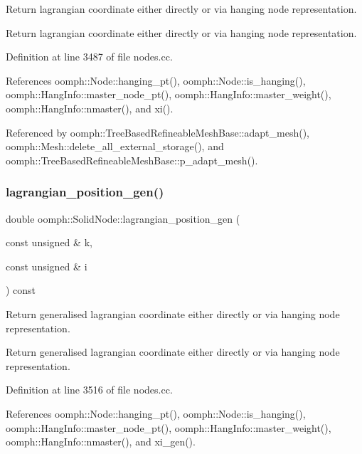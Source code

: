 Return lagrangian coordinate either directly or via hanging node representation. 

Return lagrangian coordinate either directly or via hanging node representation. 

Definition at line 3487 of file nodes.\+cc.



References oomph\+::\+Node\+::hanging\+\_\+pt(), oomph\+::\+Node\+::is\+\_\+hanging(), oomph\+::\+Hang\+Info\+::master\+\_\+node\+\_\+pt(), oomph\+::\+Hang\+Info\+::master\+\_\+weight(), oomph\+::\+Hang\+Info\+::nmaster(), and xi().



Referenced by oomph\+::\+Tree\+Based\+Refineable\+Mesh\+Base\+::adapt\+\_\+mesh(), oomph\+::\+Mesh\+::delete\+\_\+all\+\_\+external\+\_\+storage(), and oomph\+::\+Tree\+Based\+Refineable\+Mesh\+Base\+::p\+\_\+adapt\+\_\+mesh().

\mbox{\label{classoomph_1_1SolidNode_a7d001ac17bfbfdb96209d723577dd598}} 
\subsubsection{\texorpdfstring{lagrangian\+\_\+position\+\_\+gen()}{lagrangian\_position\_gen()}}
{\footnotesize\ttfamily double oomph\+::\+Solid\+Node\+::lagrangian\+\_\+position\+\_\+gen (\begin{DoxyParamCaption}\item[{const unsigned \&}]{k,  }\item[{const unsigned \&}]{i }\end{DoxyParamCaption}) const}



Return generalised lagrangian coordinate either directly or via hanging node representation. 

Return generalised lagrangian coordinate either directly or via hanging node representation. 

Definition at line 3516 of file nodes.\+cc.



References oomph\+::\+Node\+::hanging\+\_\+pt(), oomph\+::\+Node\+::is\+\_\+hanging(), oomph\+::\+Hang\+Info\+::master\+\_\+node\+\_\+pt(), oomph\+::\+Hang\+Info\+::master\+\_\+weight(), oomph\+::\+Hang\+Info\+::nmaster(), and xi\+\_\+gen().

